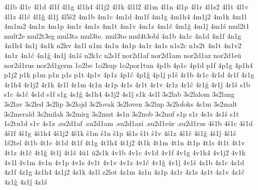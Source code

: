 {%
4l1b 4l1c 4l1d 4l1f 4l1g 4l1h4 4l1j2 4l1k 4l1l2 4l1m 4l1n 4l1p 4l1r 4l1s2
4l1t 4l1v 4l1z 4l1ĉ 4l1ĝ 4l1ĵ 4l5ŝ2 %
4m1b 4m1c 4m1d 4m1f 4m1g 4m1h4 4m1j2
4m1k 4m1l 4m1m2 4m1n 4m1p 4m1r 4m1s 4m1t 4m1v 4m1z 4m1ĉ 4m1ĝ 4m1ĵ 4m1ŝ
mul2t1 mult2e mul2t3eg mul3ta mul3te. mul3to mul4t3obl
%
4n1b 4n1c 4n1d 4n1f 4n1g 4n1h4 4n1j 4n1k
n2kv
4n1l n1m 4n1n 4n1p 4n1r 4n1s
n1s2c n1s2t
4n1t
4n1v2
4n1z 4n1ĉ 4n1ĝ 4n1ĵ 4n1ŝ
n2k1c n2s1f
nor2d1af nor2d1am nor2d1az nor2d1eŭ nor2d1rus nor2d1germ
%
1o2be 1o2kup 1o2por1tun
%
4p1b 4p1c 4p1d p1f 4p1g 4p1h4 p1j2 p1k p1m p1n p1s p1t 4p1v 4p1z 4p1ĉ
4p1ĝ 4p1ĵ p1ŝ
%
4r1b 4r1c 4r1d 4r1f 4r1g 4r1h4 4r1j2 4r1k 4r1l 4r1m 4r1n 4r1p 4r1s 4r1t
4r1v 4r1z 4r1ĉ 4r1ĝ 4r1ĵ 4r1ŝ
%
s1b s1c 4s1ĉ 4s1d s1f s1g 4s1ĝ 4s1h4 4s1j2 4s1ĵ s1k
4s1l 3s2lab 3s2lalom 3s2lang 3s2lav 3s2led 3s2lip 3s2lojd 3s2lovak
3s2loven 3s2lup 3s2lofoks
4s1m 3s2malt 3s2merald 3s2milak 3s2mirg 3s2mut %
4s1n 3s2nob 3s2nuf
s1p s1r 4s1s 4s1ŝ
s1t 1s2tu1d
s1v 4s1z
.su2d1af .su2d1am .su2d1azi .su2d1eŭr .su2d1rus
%
4ŝ1b 4ŝ1c 4ŝ1d 4ŝ1f 4ŝ1g 4ŝ1h4 4ŝ1j2 4ŝ1k ŝ1m ŝ1n ŝ1p
4ŝ1s ŝ1t ŝ1v 4ŝ1z 4ŝ1ĉ 4ŝ1ĝ 4ŝ1ĵ 4ŝ1ŝ
1ŝ2tel
%
4t1b 4t1c 4t1d 4t1f 4t1g 4t1h4 4t1j2 4t1k 4t1m 4t1n 4t1p 4t1s 4t1t 4t1v
4t1z 4t1ĉ 4t1ĝ 4t1ĵ 4t1ŝ
%
4ŭ1 ŭ2s1k
%
4v1b 4v1c 4v1d 4v1f 4v1g 4v1h4 4v1j2 4v1k 4v1l 4v1m 4v1n 4v1p 4v1s 4v1t 4v1v
4v1z 4v1ĉ 4v1ĝ 4v1ĵ 4v1ŝ
%
4z1b 4z1c 4z1d 4z1f 4z1g 4z1h4 4z1j2 4z1k 4z1l
z2lot
4z1m 4z1n 4z1p 4z1r 4z1s 4z1t 4z1v 4z1ĉ 4z1ĝ 4z1ĵ 4z1ŝ
}         %
\endgroup
\endinput

%
%
%
%
